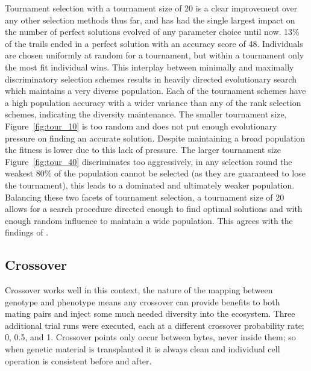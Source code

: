 Tournament selection with a tournament size of 20 is a clear improvement over
any other selection methods thus far, and has had the single largest impact
on the number of perfect solutions evolved of any parameter choice until
now. 13\% of the trails ended in a perfect solution with an accuracy score of 48.
Individuals are chosen uniformly at random for a tournament, but within a
tournament only the most fit individual wins. This interplay between minimally
and maximally discriminatory selection schemes results in heavily directed evolutionary
search which maintains a very diverse population. Each of the tournament schemes
have a high population accuracy with a wider variance than any of the rank
selection schemes, indicating the diversity maintenance. The smaller tournament
size, Figure~\ref{fig:tour_10} is too random and does not put enough evolutionary
pressure on finding an accurate solution.
Despite maintaining a broad population the fitness is lower due to this lack of
pressure. The larger tournament size Figure~\ref{fig:tour_40} discriminates too
aggressively, in any selection round the weakest 80\% of the population cannot
be selected (as they are guaranteed to lose the tournament), this leads to a
dominated and ultimately weaker population.
Balancing these two facets of tournament selection, a tournament size
of 20 allows for a search procedure directed enough to find optimal solutions
and with enough random influence to maintain a wide population. This agrees
with the findings of \cite{TournamentAdder}.

\subsection{Crossover}
Crossover works well in this context, the nature of the mapping between genotype
and phenotype means any crossover can provide benefits to both mating pairs and
inject some much needed diversity into the ecosystem. Three additional trial runs
were executed, each at a different crossover probability rate; 0, 0.5, and 1.
Crossover points only occur between bytes, never inside them; so
when genetic material is transplanted it is always clean and individual cell
operation is consistent before and after.

